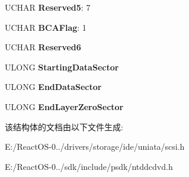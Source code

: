 \begin{DoxyCompactItemize}
\mbox{\label{struct___d_v_d___l_a_y_e_r___d_e_s_c_r_i_p_t_o_r_a6c9da977bea0e172881d723c452d403f}} 
U\+C\+H\+AR {\bfseries Reserved5}\+: 7
\item 
\mbox{\label{struct___d_v_d___l_a_y_e_r___d_e_s_c_r_i_p_t_o_r_a431e003c6ad72179f0ef95ac15f00d90}} 
U\+C\+H\+AR {\bfseries B\+C\+A\+Flag}\+: 1
\item 
\mbox{\label{struct___d_v_d___l_a_y_e_r___d_e_s_c_r_i_p_t_o_r_a9bf88a5cdb1efbae7e0ab8432fce562a}} 
U\+C\+H\+AR {\bfseries Reserved6}
\item 
\mbox{\label{struct___d_v_d___l_a_y_e_r___d_e_s_c_r_i_p_t_o_r_a1cbb41127d452b3b4a1d8b93f8a266f2}} 
U\+L\+O\+NG {\bfseries Starting\+Data\+Sector}
\item 
\mbox{\label{struct___d_v_d___l_a_y_e_r___d_e_s_c_r_i_p_t_o_r_a9f6c16f5de5d1946ec51e2274459df47}} 
U\+L\+O\+NG {\bfseries End\+Data\+Sector}
\item 
\mbox{\label{struct___d_v_d___l_a_y_e_r___d_e_s_c_r_i_p_t_o_r_ac9fe91653d9ae4f19cb24b41d0b16519}} 
U\+L\+O\+NG {\bfseries End\+Layer\+Zero\+Sector}
\end{DoxyCompactItemize}


该结构体的文档由以下文件生成\+:\begin{DoxyCompactItemize}
\item 
E\+:/\+React\+O\+S-\/0../drivers/storage/ide/uniata/scsi.\+h\item 
E\+:/\+React\+O\+S-\/0../sdk/include/psdk/ntddcdvd.\+h\end{DoxyCompactItemize}
